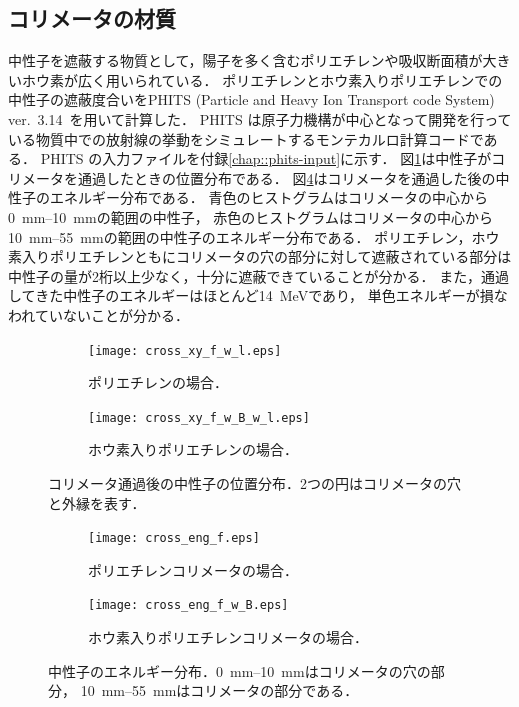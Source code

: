 \documentclass[../master]{subfiles}
\begin{document}
\subsection{コリメータの材質}
中性子を遮蔽する物質として，陽子を多く含むポリエチレンや吸収断面積が大きいホウ素が広く用いられている．
ポリエチレンとホウ素入りポリエチレンでの中性子の遮蔽度合いをPHITS (Particle and Heavy Ion Transport code System)
ver.~3.14~\cite{phits}を用いて計算した．
PHITS は原子力機構が中心となって開発を行っている物質中での放射線の挙動をシミュレートするモンテカルロ計算コードである．
PHITS の入力ファイルを付録\ref{chap::phits-input}に示す．
図\ref{collimator_xy_pos}は中性子がコリメータを通過したときの位置分布である．
図\ref{fig::neutron_energy}はコリメータを通過した後の中性子のエネルギー分布である．
青色のヒストグラムはコリメータの中心から\SIrange{0}{10}{\milli\metre}の範囲の中性子，
赤色のヒストグラムはコリメータの中心から\SIrange{10}{55}{\milli\metre}の範囲の中性子のエネルギー分布である．
ポリエチレン，ホウ素入りポリエチレンともにコリメータの穴の部分に対して遮蔽されている部分は
中性子の量が2桁以上少なく，十分に遮蔽できていることが分かる．
また，通過してきた中性子のエネルギーはほとんど\SI{14}{\mega\electronvolt}であり，
単色エネルギーが損なわれていないことが分かる．
\begin{figure}
  \centering
  \begin{subfigure}{\columnwidth}
    \centering
    \texttt{[image: cross\_xy\_f\_w\_l.eps]}
    \caption{ポリエチレンの場合．}
  \end{subfigure}
  \begin{subfigure}{\columnwidth}
    \centering
    \texttt{[image: cross\_xy\_f\_w\_B\_w\_l.eps]}
    \caption{ホウ素入りポリエチレンの場合．}
  \end{subfigure}
  \caption[コリメータ通過後の中性子の位置分布．]
          {コリメータ通過後の中性子の位置分布．2つの円はコリメータの穴と外縁を表す．}
  \label{collimator_xy_pos}
\end{figure}
\begin{figure}
  \begin{subfigure}{\columnwidth}
    \centering
    \texttt{[image: cross\_eng\_f.eps]}
    \caption{ポリエチレンコリメータの場合．}
    \label{fig::neutron_energy_dist}
  \end{subfigure}
  \begin{subfigure}{\columnwidth}
    \centering
    \texttt{[image: cross\_eng\_f\_w\_B.eps]}
    \caption{ホウ素入りポリエチレンコリメータの場合．}
    \label{fig::neutron_energy_dist_w_B}
  \end{subfigure}
  \caption[中性子のエネルギー分布．]
          {中性子のエネルギー分布．\SIrange{0}{10}{\milli\metre}はコリメータの穴の部分，
          \SIrange{10}{55}{\milli\metre}はコリメータの部分である．}
  \label{fig::neutron_energy}
\end{figure}
\end{document}
